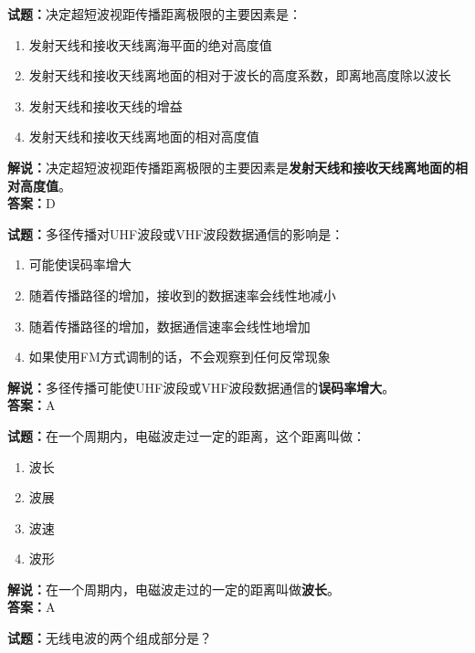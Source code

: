 \documentclass{ctexbook}
\begin{document}
\noindent\textbf{试题：}决定超短波视距传播距离极限的主要因素是：

\begin{enumerate}[leftmargin=3em]
	\item 发射天线和接收天线离海平面的绝对高度值
	\item 发射天线和接收天线离地面的相对于波长的高度系数，即离地高度除以波长
	\item 发射天线和接收天线的增益
	\item 发射天线和接收天线离地面的相对高度值
\end{enumerate}

\noindent\textbf{解说：}决定超短波视距传播距离极限的主要因素是\textbf{发射天线和接收天线离地面的相对高度值}。\\\noindent\textbf{答案：}D


\bigskip


\noindent\textbf{试题：}多径传播对UHF波段或VHF波段数据通信的影响是：

\begin{enumerate}[leftmargin=3em]
	\item 可能使误码率增大
	\item 随着传播路径的增加，接收到的数据速率会线性地减小
	\item 随着传播路径的增加，数据通信速率会线性地增加
	\item 如果使用FM方式调制的话，不会观察到任何反常现象
\end{enumerate}

\noindent\textbf{解说：}多径传播可能使UHF波段或VHF波段数据通信的\textbf{误码率增大}。\\\noindent\textbf{答案：}A


\bigskip


\noindent\textbf{试题：}在一个周期内，电磁波走过一定的距离，这个距离叫做：

\begin{enumerate}[leftmargin=3em]
	\item 波长
	\item 波展
	\item 波速
	\item 波形
\end{enumerate}

\noindent\textbf{解说：}在一个周期内，电磁波走过的一定的距离叫做\textbf{波长}。\\\noindent\textbf{答案：}A


\bigskip


\noindent\textbf{试题：}无线电波的两个组成部分是？
\end{document}
